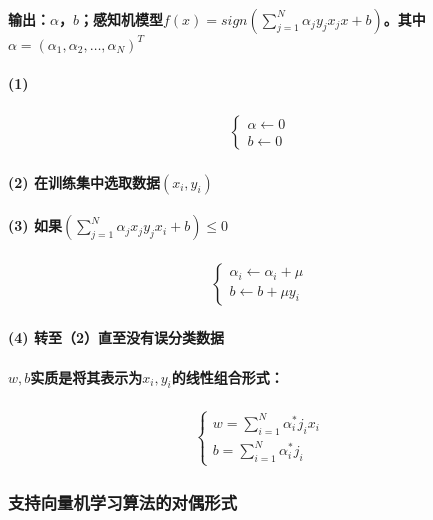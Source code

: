 \documentclass[UTF8]{ctexart}
\begin{document}
\paragraph{输出：$\alpha$，$b$；感知机模型$f(x)=sign(\sum\limits_{j=1}^{N} \alpha_{j}y_{j}x_{j}x+b)$。其中$\alpha=(\alpha_1,\alpha_2,\dots,\alpha_N)^T$}
\paragraph{(1)}
\begin{align*}
    \begin{cases}
        \alpha\leftarrow 0 \\
        b\leftarrow 0
    \end{cases}
\end{align*}
\paragraph{(2) 在训练集中选取数据$(x_i,y_i)$}
\paragraph{(3) 如果$(\sum\limits_{j=1}^{N} \alpha_{j}x_{j}y_{j}x_{i}+b)\le 0$}
\begin{align*}
    \begin{cases}
        \alpha_{i}\leftarrow\alpha_{i}+\mu \\
        b\leftarrow b+\mu y_{i}
    \end{cases}
\end{align*}
\paragraph{(4) 转至（2）直至没有误分类数据}
\paragraph{$w,b$实质是将其表示为$x_i,y_i$的线性组合形式：}
\begin{align*}
    \begin{cases}
        w=\sum\limits_{i=1}^{N}\alpha_i^*j_ix_i \\
        b=\sum\limits_{i=1}^{N}\alpha_i^*j_i
    \end{cases}
\end{align*}

\subsubsection{支持向量机学习算法的对偶形式}
\end{document}
